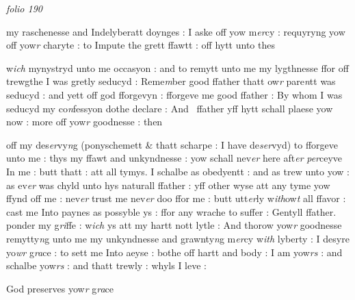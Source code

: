 \documentclass[12pt, a4paper]{book}
\begin{document}
      				
\dotfill
						\newpage
{}

\textit{folio 190}
      				
      				
      				
      					
				\marginpar[\vspace{0.5cm}{\textcolor{Gray}{n}}]{}
			
      					
		\ifthenelse{\isodd{\thepage}}
		{\reversemarginpar}
		{\normalmarginpar}
		my raschenesse and Indelyberatt doynges : I aske off yow m\textit{er}cy : requyryng yow off yow\textit{r }charyte : to Impute the grett ffawtt : off hytt unto thes 

 w\textit{ich} mynystryd unto me occasyon : and to remytt unto me my lygthnesse ffor off trewgthe I was gretly seducyd : Reme\textit{m}ber good ffather thatt ow\textit{r}  pare\textit{n}tt was seducyd : and yett off god fforgevyn : fforgeve me good ffather : By whom I was seducyd my co\textit{n}fessyon dothe declare : And  ffather yff hytt schall plaese yow now : more off yow\textit{r} goodnesse : then 
      				

	
				\marginpar[\vspace{0.5cm}{\textcolor{Gray}{m}}]{}
			
	
		\ifthenelse{\isodd{\thepage}}
		{\reversemarginpar}
		{\normalmarginpar}
		off my des\textit{er}vy\textit{n}g (ponyschemett \& thatt scharpe : I have de\textit{ser}vyd) to  fforgeve unto me : thys my ffawt and unkyndnesse : yow schall nev\textit{er} here aft\textit{er}
      				\textit{per}ceyve In me : butt thatt : att all tymys. I schalbe as obedyentt : and as trew unto yow : as ev\textit{er} was chyld unto hys naturall ffather : yff other wyse att any tyme yow ffynd off me : nev\textit{er} trust me nev\textit{er} doo ffor me : butt utt\textit{er}ly w\textit{ith}ow\textit{t }all ffavor : cast me Into paynes as possyble ys : ffor any wrache to suffer : Gentyll ffather. ponder my g\textit{ri}ffe : w\textit{ich} ys att my hartt nott lytle : And thorow yow\textit{r} goodnesse remytty\textit{n}g unto me my unkyndnesse and grawnty\textit{n}g m\textit{er}cy w\textit{ith} lyberty : I desyre yo\textit{wr} g\textit{ra}ce : to sett me Into aeyse : bothe off hartt and body : I am yow\textit{rs} : and schalbe yow\textit{rs} : and thatt trewly : whyls I leve :

      				
      					
		\ifthenelse{\isodd{\thepage}}
		{\reversemarginpar}
		{\normalmarginpar}
		God preserves yow\textit{r} g\textit{ra}ce
      				 
\end{document}
